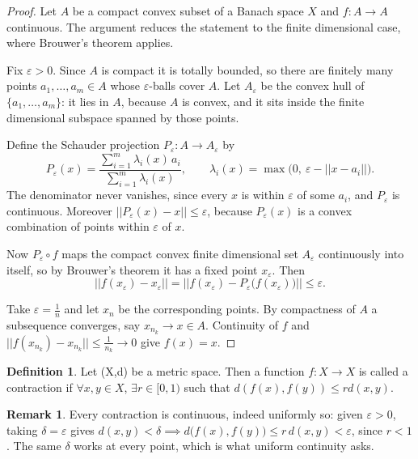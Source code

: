 \documentclass[11pt,a4paper]{article}
\theoremstyle{definition}
\newtheorem{defn}[thm]{Definition}
\newtheorem*{remark}{Remark}
\begin{document}
\begin{proof}
Let $A$ be a compact convex subset of a Banach space $X$ and
$f:A\rightarrow A$ continuous. The argument reduces the statement to the
finite dimensional case, where Brouwer's theorem applies.

Fix $\varepsilon>0$. Since $A$ is compact it is totally bounded, so there are
finitely many points $a_1,\dots,a_m\in A$ whose $\varepsilon$-balls cover $A$.
Let $A_\varepsilon$ be the convex hull of $\{a_1,\dots,a_m\}$: it lies in $A$,
because $A$ is convex, and it sits inside the finite dimensional subspace
spanned by those points.

Define the Schauder projection $P_\varepsilon:A\rightarrow A_\varepsilon$ by
$$P_\varepsilon(x)=\frac{\sum_{i=1}^{m}\lambda_i(x)\,a_i}{\sum_{i=1}^{m}\lambda_i(x)},
\qquad \lambda_i(x)=\max\big(0,\ \varepsilon-||x-a_i||\big).$$
The denominator never vanishes, since every $x$ is within $\varepsilon$ of some
$a_i$, and $P_\varepsilon$ is continuous. Moreover
$||P_\varepsilon(x)-x||\leq\varepsilon$, because $P_\varepsilon(x)$ is a convex
combination of points within $\varepsilon$ of $x$.

Now $P_\varepsilon\circ f$ maps the compact convex finite dimensional set
$A_\varepsilon$ continuously into itself, so by Brouwer's theorem it has a fixed
point $x_\varepsilon$. Then
$$||f(x_\varepsilon)-x_\varepsilon||
=||f(x_\varepsilon)-P_\varepsilon\big(f(x_\varepsilon)\big)||\leq\varepsilon .$$

Take $\varepsilon=\frac1n$ and let $x_n$ be the corresponding points. By
compactness of $A$ a subsequence converges, say $x_{n_k}\rightarrow x\in A$.
Continuity of $f$ and $||f(x_{n_k})-x_{n_k}||\leq\frac{1}{n_k}\rightarrow 0$
give $f(x)=x$.
\end{proof}

\begin{defn}
Let (X,d) be a metric space. Then a function $f:X\rightarrow X$ is called a contraction if $\forall x,y\in X$, $\exists r\in [0,1)$ such that $d(f(x),f(y))\leq rd(x,y)$.


\end{defn}

\begin{remark}
Every contraction is continuous, indeed uniformly so: given $\varepsilon>0$, taking $\delta=\varepsilon$ gives $d(x,y)<\delta\implies d\big(f(x),f(y)\big)\leq r\,d(x,y)<\varepsilon$, since $r<1$. The same $\delta$ works at every point, which is what uniform continuity asks.
\end{remark}
\end{document}
